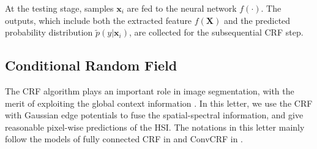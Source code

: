 \documentclass[]{article}
\newcommand{\magentaso}{\color{black}}
\begin{document}
At the testing stage, samples $\mathbf{x}_i$ are fed to the neural network $f(\cdot)$.
The outputs{, \magentaso which} include both the extracted
feature $f(\mathbf{X})$ and the predicted probability distribution $\tilde{p}(y|\mathbf{x}_i)$, 
{\magentaso are} collected for the subsequential CRF step.

\subsection{Conditional Random Field}

The CRF algorithm plays an important role in image segmentation, with the merit of
exploiting the global context information
\cite{lafferty2001conditional, krahenbuhl2011efficient, teichmann2018convolutional}.
In this letter, we use the CRF with Gaussian edge potentials to fuse the spatial-spectral information, 
and give reasonable {\magentaso pixel-wise} predictions of the HSI.
The notations in this letter mainly follow the models of fully connected CRF in \cite{krahenbuhl2011efficient} and ConvCRF in \cite{teichmann2018convolutional}.
\end{document}
